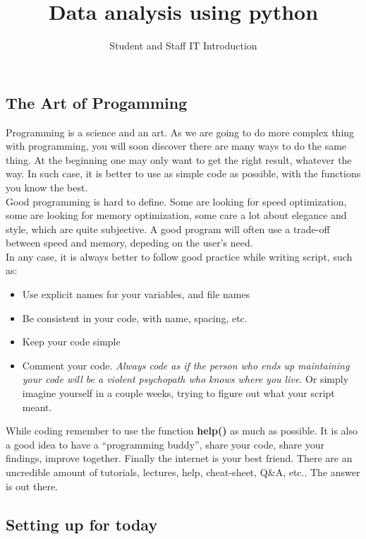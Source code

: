 \documentclass[article,10pt]{scrartcl}
\begin{document}
\title{Data analysis using python}
\subtitle{Student and Staff IT Introduction}
\maketitle



\subsection*{The Art of Progamming}
Programming is a science and an art. As we are going to do more complex thing with programming, you will soon discover there are many ways to do the same thing. At the beginning one may only want to get the right result, whatever the way. In such case, it is better to use as simple code as possible, with the functions you know the best.\\
Good programming is hard to define. Some are looking for speed optimization, some are looking for memory optimization, some care a lot about elegance and style, which are quite subjective. A good program will often use a trade-off between speed and memory, depeding on the user's need.
\\

In any case, it is always better to follow good practice while writing script, such as:
\begin{itemize}
\item Use explicit names for your variables, and file names
\item Be consistent in your code, with name, spacing, etc.
\item Keep your code simple
\item Comment your code. \textit{Always code as if the person who ends up maintaining your code will be a violent psychopath who knows where you live}. Or simply imagine yourself in a couple weeks, trying to figure out what your script meant.
\end{itemize}

While coding remember to use the function \textbf{help()} as much as possible. It is also a good idea to have a ``programming buddy'', share your code, share your findings, improve together. Finally the internet is your best friend. There are an uncredible amount of tutorials, lectures, help, cheat-sheet, Q\&A, etc.. The answer is out there.

\subsection*{Setting up for today}
\end{document}
